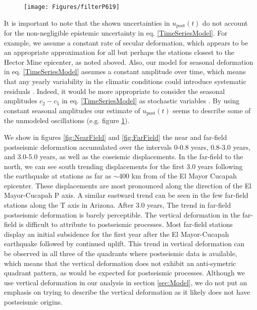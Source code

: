 \documentclass[1p]{elsarticle}
\begin{document}
\begin{figure}
\texttt{[image: Figures/filterP619]}
\centering
\caption{} 
\label{fig:P619}
\end{figure}

It is important to note that the shown uncertainties in $u_\mathrm{post}(t)$ do not account for the non-negligible epistemic uncertainty in eq. \ref{TimeSeriesModel}.  For example, we assume a constant rate of secular deformation, which appears to be an appropriate approximation for all but perhaps the stations closest to the Hector Mine epicenter, as noted aboved.  Also, our model for seasonal deformation in eq. \ref{TimeSeriesModel} assumes a constant amplitude over time, which means that any yearly variability in the climatic conditions could introduce systematic residuals \citep{Davis2012}. Indeed, it would be more appropriate to consider the seasonal amplitudes $c_2-c_5$ in eq. \ref{TimeSeriesModel} as stochastic variables \citep{Murray2005}. By using constant seasonal amplitudes our estimate of $u_\mathrm{post}(t)$ seems to describe some of the unmodeled oscillations (e.g. figure \ref{fig:P619}).          

We show in figures \ref{fig:NearField} and \ref{fig:FarField} the near and far-field postseismic deformation accumulated over the intervals  0-0.8 years, 0.8-3.0 years, and 3.0-5.0 years, as well as the coseismic displacements.  In the far-field to the north, we can see south trending displacements for the first 3.0 years following the earthquake at stations as far as $\sim$400 km from of the El Mayor Cucapah epicenter.  These displacements are most pronounced along the direction of the El Mayor-Cucapah P axis. A similar eastward trend can be seen in the few far-field stations along the T axis in Arizona.  After 3.0 years, The trend in far-field postseismic deformation is barely perceptible.  The vertical deformation in the far-field is difficult to attribute to postseismic processes.  Most far-field stations display an initial subsidence for the first year after the El Mayor-Cucapah earthquake followed by continued uplift.  This trend in vertical deformation can be observed in all three of the quadrants where postseismic data is available, which means that the vertical deformation does not exhibit an anti-symetric quadrant pattern, as would be expected for postseismic processes.  Although we use vertical deformation in our analysis in section \ref{sec:Model},  we do not put an emphasis on trying to describe the vertical deformation as it likely does not have postseismic origins.        
\end{document}
